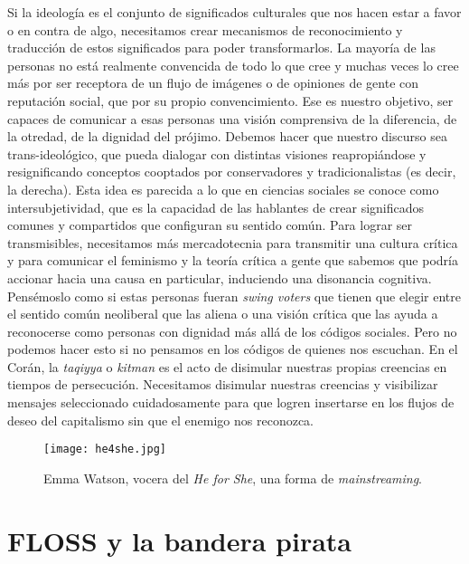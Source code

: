 Si la ideología es el conjunto de significados culturales que nos hacen estar a favor o en contra de algo, necesitamos crear mecanismos de reconocimiento y traducción de estos significados para poder transformarlos. La mayoría de las personas no está realmente convencida de todo lo que cree y muchas veces lo cree más por ser receptora de un flujo de imágenes o de opiniones de gente con reputación social, que por su propio convencimiento. Ese es nuestro objetivo, ser capaces de comunicar a esas personas una visión comprensiva de la diferencia, de la otredad, de la dignidad del prójimo. Debemos hacer que nuestro discurso sea trans-ideológico, que pueda dialogar con distintas visiones reapropiándose y resignificando conceptos cooptados por conservadores y tradicionalistas (es decir, la derecha). Esta idea es parecida a lo que en ciencias sociales se conoce como intersubjetividad, que es la capacidad de las hablantes de crear significados comunes y compartidos que configuran su sentido común. Para lograr ser transmisibles, necesitamos más mercadotecnia para transmitir una cultura crítica y para comunicar el feminismo y la teoría crítica a gente que sabemos que podría accionar hacia una causa en particular, induciendo una disonancia cognitiva. Pensémoslo como si estas personas fueran \emph{swing voters} que tienen que elegir entre el sentido común neoliberal que las aliena o una visión crítica que las ayuda a reconocerse como personas con dignidad más allá de los códigos sociales. Pero no podemos hacer esto si no pensamos en los códigos de quienes nos escuchan. En el Corán, la \emph{taqiyya} o \emph{kitman} es el acto de disimular nuestras propias creencias en tiempos de persecución. Necesitamos disimular nuestras creencias y visibilizar mensajes seleccionado cuidadosamente para que logren insertarse en los flujos de deseo del capitalismo sin que el enemigo nos reconozca.

\begin{figure}[htbp]
	\centering
	\texttt{[image: he4she.jpg]}
	\caption[Emma Watson, vocera del \emph{He for She}.]{Emma Watson, vocera del \emph{He for She}, una forma de \emph{mainstreaming}.}
	\label{fig:he4she}
\end{figure}

\section{FLOSS y la bandera pirata}
\label{sec:FLOS}

